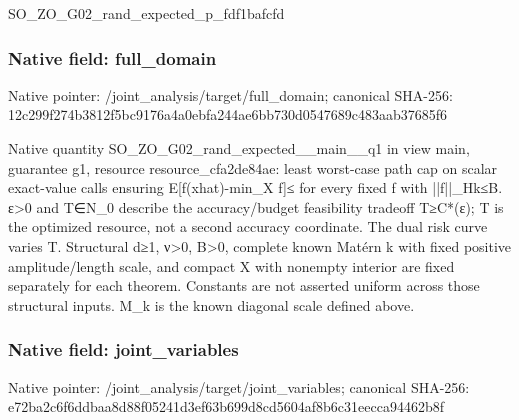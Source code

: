 \documentclass[10pt,a4paper]{article}
\begin{document}
\begingroup\raggedright\sloppy SO\_\allowbreak{}ZO\_\allowbreak{}G02\_\allowbreak{}rand\_\allowbreak{}expected\_\allowbreak{}p\_\allowbreak{}fdf1bafcfd\par\endgroup

\subsubsection{Native field: full\_\allowbreak{}domain}
Native pointer: /joint\_\allowbreak{}analysis/target/full\_\allowbreak{}domain; canonical SHA-256: 12c299f274b3812f5bc9176a4a0ebfa244ae6bb730d0547689c483aab37685f6

\begingroup\raggedright\sloppy Native quantity SO\_\allowbreak{}ZO\_\allowbreak{}G02\_\allowbreak{}rand\_\allowbreak{}expected\_\allowbreak{}\_\allowbreak{}main\_\allowbreak{}\_\allowbreak{}q1 in view main,\allowbreak{} guarantee g1,\allowbreak{} resource resource\_\allowbreak{}cfa2de84ae:\allowbreak{} least worst-case path cap on scalar exact-value calls ensuring E[f(xhat)-min\_\allowbreak{}X f]{\AtlasUnicodeSymbols ≤}\allowbreak{} for every fixed f with ||f||\_\allowbreak{}Hk{\AtlasUnicodeSymbols ≤}\allowbreak{}B. {\AtlasUnicodeText ε}\allowbreak{}>0 and T{\AtlasUnicodeSymbols ∈}\allowbreak{}N\_\allowbreak{}0 describe the accuracy/\allowbreak{}budget feasibility tradeoff T{\AtlasUnicodeSymbols ≥}\allowbreak{}C*({\AtlasUnicodeText ε}\allowbreak{});\allowbreak{} T is the optimized resource,\allowbreak{} not a second accuracy coordinate. The dual risk curve varies T. Structural d{\AtlasUnicodeSymbols ≥}\allowbreak{}1,\allowbreak{} {\AtlasUnicodeText ν}\allowbreak{}>0,\allowbreak{} B>0,\allowbreak{} complete known Mat{\AtlasUnicodeText é}\allowbreak{}rn k with fixed positive amplitude/\allowbreak{}length scale,\allowbreak{} and compact X with nonempty interior are fixed separately for each theorem. Constants are not asserted uniform across those structural inputs. M\_\allowbreak{}k is the known diagonal scale defined above.\par\endgroup

\subsubsection{Native field: joint\_\allowbreak{}variables}
Native pointer: /joint\_\allowbreak{}analysis/target/joint\_\allowbreak{}variables; canonical SHA-256: e72ba2c6f6ddbaa8d88f05241d3ef63b699d8cd5604af8b6c31eecca94462b8f
\end{document}
